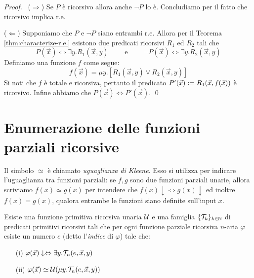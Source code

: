 \documentclass[runningheads,a4paper]{llncs}
\begin{document}
\begin{proof}
\ 
\noindent($\Rightarrow$) Se $P$ \`{e} ricorsivo allora anche $\neg P$ lo \`{e}. Concludiamo per il fatto che ricorsivo implica r.e.

\noindent($\Leftarrow$) Supponiamo che $P$ e $\neg P$ siano entrambi r.e. Allora per il Teorema \ref{thm:characterize-r.e.} esistono
 due predicati ricorsivi $R_1$ ed $R_2$ tali che 
$$ P(\vec x) \iff \exists y.R_1(\vec x,y) \qquad \mbox{ e } \qquad \neg P(\vec x) \iff \exists y.R_2(\vec x,y) $$
Definiamo una funzione $f$ come segue:
$$f(\vec x) = \mu y.[R_1(\vec x,y) \vee R_2(\vec x,y)]$$
Si noti che $f$ \`{e} totale e ricorsiva, pertanto il predicato $P'(\vec x) \mathrel{:=} R_1(\vec x, f(\vec x))$ \`{e} ricorsivo.
 Infine abbiamo che $P(\vec x) \iff P'(\vec x)$.
\qed\end{proof}

\section{Enumerazione delle funzioni parziali ricorsive}

Il simbolo $\simeq$ \`{e} chiamato \emph{uguaglianza di Kleene}. Esso si utilizza per indicare l'uguaglianza tra funzioni parziali: se 
 $f,g$ sono due funzioni parziali unarie, allora scriviamo $f(x) \simeq g(x)$ per intendere che $f(x)\downarrow \iff g(x)\downarrow$ ed inoltre
 $f(x) = g(x)$, qualora entrambe le funzioni siano definite sull'input $x$.

\begin{theorem}\label{thm:normal-form}
Esiste una funzione primitiva ricorsiva unaria $\mathcal{U}$ e una famiglia $\{\mathcal{T}_k\}_{k \in \mathbb{N}}$ di predicati primitivi ricorsivi
 tali che per ogni funzione parziale ricorsiva $n$-aria $\varphi$ esiste un numero $e$ (detto l'\emph{indice} di $\varphi$) tale che:
\begin{itemize}
\item[(i)] $\varphi(\vec x)\downarrow \Leftrightarrow \exists y.\mathcal{T}_n(e,\vec x,y)$
\item[(ii)] $\varphi(\vec x) \simeq \mathcal{U}(\mu y.\mathcal{T}_n(e,\vec x,y))$
\end{itemize}
\end{theorem}
\end{document}

